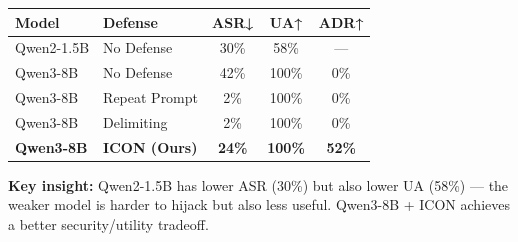 \begin{table}[h]
\centering
\scriptsize
\renewcommand{\arraystretch}{1.3}
\begin{tabular}{llccc}
\toprule
\textbf{Model} & \textbf{Defense} & \textbf{ASR↓} & \textbf{UA↑} & \textbf{ADR↑} \\
\midrule
Qwen2-1.5B & No Defense       & 30\% & 58\%  & — \\
\midrule
Qwen3-8B   & No Defense       & 42\% & 100\% & 0\% \\
Qwen3-8B   & Repeat Prompt    &  2\% & 100\% & 0\% \\
Qwen3-8B   & Delimiting       &  2\% & 100\% & 0\% \\
\rowcolor{teal!12}
\textbf{Qwen3-8B} & \textbf{ICON (Ours)} & \textbf{24\%} & \textbf{100\%} & \textbf{52\%} \\
\bottomrule
\end{tabular}
\vspace{1mm}

{\tiny \textbf{Key insight:} Qwen2-1.5B has lower ASR (30\%) but also lower UA (58\%) — the weaker model is harder to hijack but also less useful. Qwen3-8B + ICON achieves a better security/utility tradeoff.}
\end{table}
